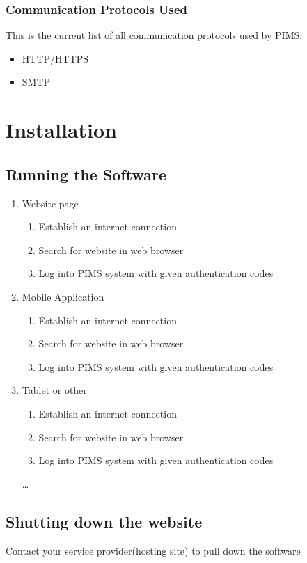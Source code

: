 \documentclass[14pt, a4paper]{article}
\begin{document}
\subsubsection{Communication Protocols Used}
This is the current list of all communication protocols used by PIMS:
\begin{itemize}
	\item HTTP/HTTPS
	\item SMTP
\end{itemize}
\newpage

\newpage


\section{Installation}
\subsection{Running the Software}
\begin{enumerate}
  \item Website page
  \begin{enumerate}
  \item Establish an internet connection
    \item Search for website in web browser
    \item Log into PIMS system with given authentication codes
  \end{enumerate}
  \item Mobile Application
   \begin{enumerate}
   \item Establish an internet connection
    \item Search for website in web browser
    \item Log into PIMS system with given authentication codes
  \end{enumerate}
  \item Tablet or other
   \begin{enumerate}
\item Establish an internet connection  
    \item Search for website in web browser
    \item Log into PIMS system with given authentication codes
  \end{enumerate} \ldots
\end{enumerate}

\subsection{Shutting down the website}
Contact your service provider(hosting site) to pull down the software
\newpage
\end{document}

